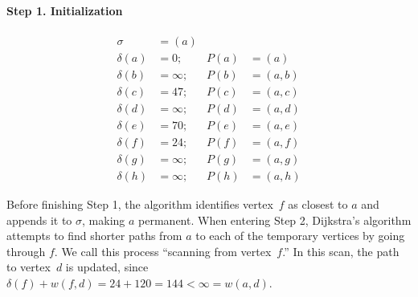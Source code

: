 \documentclass[10pt,]{book}
\theoremstyle{plain}
\theoremstyle{definition}
\theoremstyle{definition}
\theoremstyle{definition}
\theoremstyle{definition}
\numberwithin{equation}{section}
\newcommand{\lt}{<}
\newcommand{\amp}{&}
\begin{document}
\paragraph[{Step 1. Initialization}]{Step 1. Initialization}\hypertarget{paragraphs-1}{}
\hypertarget{p-199}{}%
%
\begin{align*}
\sigma\amp=(a)\amp\amp\\
\delta(a)\amp=0; \amp P(a)\amp=(a)\\
\delta(b) \amp=\infty; \amp P(b)\amp=(a,b)\\
\delta(c) \amp=47; \amp P(c)\amp=(a,c)\\
\delta(d) \amp=\infty; \amp P(d)\amp=(a,d)\\
\delta(e) \amp=70; \amp P(e)\amp=(a,e)\\
\delta(f) \amp=24; \amp P(f)\amp=(a,f)\\
\delta(g) \amp=\infty; \amp P(g)\amp=(a,g)\\
\delta(h) \amp=\infty; \amp P(h)\amp=(a,h)
\end{align*}
%
\par
\hypertarget{p-200}{}%
Before finishing Step 1, the algorithm identifies vertex~\(f\) as closest to \(a\) and appends it to \(\sigma\), making \(a\) permanent. When entering Step 2, Dijkstra's algorithm attempts to find shorter paths from \(a\) to each of the temporary vertices by going through \(f\). We call this process ``scanning from vertex~\(f\).'' In this scan, the path to vertex~\(d\) is updated, since \(\delta(f) + w(f,d)=24+120=144\lt \infty=w(a,d)\).%
\typeout{************************************************}
\typeout{************************************************}
\end{document}
